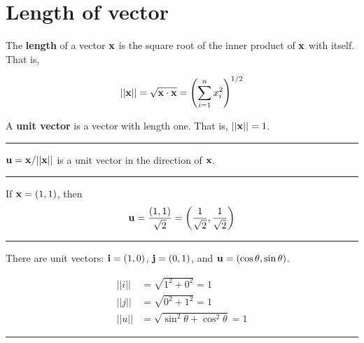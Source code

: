 %
%
\section{Length of vector}
\begin{tcolorbox}[colback=yellow!10!,colframe=gray!15!]
\begin{definition} 
The \textbf{length} of a vector ${\bf x}$ is the square root of the inner product of ${\bf x}$ with itself.  That is, 

\[ || {\bf x}|| = \sqrt{{\bf x} \cdot {\bf x}} = \left(\sum_{i=1}^n x_i^2\right)^{1/2} \]
\end{definition}	 
\end{tcolorbox} 



\begin{definition} 
A \textbf{unit vector} is a vector with length one.  That is, $ || {\bf x}|| = 1$. 
\end{definition}	 

\rule[0.01in]{\textwidth}{0.0025in}


\begin{definition} 
${\bf u} = {\bf x} / || {\bf x} ||$ is a unit vector in the direction of ${\bf x}$. 
\end{definition}	 

\rule[0.01in]{\textwidth}{0.0025in}

\begin{example}
If ${\bf x} = (1,1)$, then 
\[ {\bf u} = \frac{(1,1)}{\sqrt{2}} = \left(\frac{1}{\sqrt{2}}, \frac{1}{\sqrt{2}}\right) \] 
\end{example}
\rule[0.01in]{\textwidth}{0.0025in}


\begin{example}
There are unit vectors:  ${\bf i} = (1,0)$, ${\bf j} = (0,1)$, and ${\bf u} = (\cos \theta, \sin \theta)$.  

\begin{align*}
|| i || &= \sqrt{1^2+0^2} = 1\\
|| j || &= \sqrt{0^2+1^2} = 1\\
|| u || &= \sqrt{\sin^2 \theta + \cos^2 \theta} = 1
\end{align*}
\end{example}
\rule[0.01in]{\textwidth}{0.0025in}










